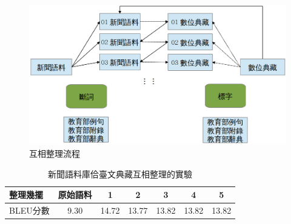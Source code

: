 \begin{figure}
\centerline{\includegraphics[keepaspectratio,width=40em]{圖/互相整理架構}}
\caption{互相整理流程}
\label{圖：互相整理架構}
\end{figure}

\begin{table}
\caption{新聞語料庫佮臺文典藏互相整理的實驗}
\label{表：互相整理實驗}
\centering
\begin{tabular}{l|cccccc}
整理幾擺 & 原始語料 & 1 & 2 & 3 & 4 & 5\\
\hline
BLEU分數 & 9.30 & 14.72 & 13.77 & 13.82 & 13.82 & 13.82\\
\end{tabular}
\end{table}

